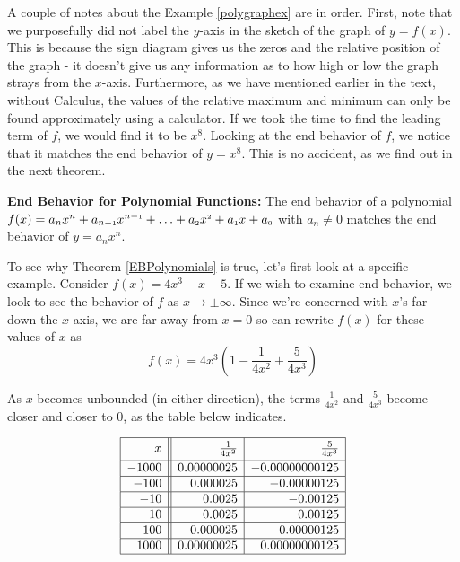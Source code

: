 A couple of notes about the Example \ref{polygraphex} are in order.  First, note that we purposefully did not label the $y$-axis in the sketch of the graph of $y=f(x)$.  This is because the sign diagram gives us the zeros and the relative position of the graph - it doesn't give us any information as to how high or low the graph strays from the $x$-axis.  Furthermore, as we have mentioned earlier in the text, without Calculus, the values of the relative maximum and minimum can only be found approximately using a calculator.  If we took the time to find the leading term of $f$, we would find it to be $x^8$.  Looking at the end behavior of $f$, we notice that it matches the end behavior of $y=x^8$.  This is no accident, as we find out in the next theorem.

\medskip

\colorbox{ResultColor}{\bbm

\begin{thm} \label{EBPolynomials}\textbf{End Behavior for Polynomial Functions:} The end behavior of a polynomial $f(x) = a_{n} x^{n} + a_{n-\mbox{\tiny$1$}} x^{n-\mbox{\tiny$1$}} + \ldots + a_{\mbox{\tiny $2$}} x^{\mbox{\tiny $2$}} + a_{\mbox{\tiny $1$}} x + a_{\mbox{\tiny $0$}}$ with $a_{n} \neq 0$ matches the end behavior of $y = a_{n} x^{n}$.  
\end{thm}

\ebm}

\medskip

To see why Theorem \ref{EBPolynomials} is true, let's first look at a specific example.  Consider $f(x) = 4x^3 - x + 5$.  If we wish to examine end behavior, we look to see the behavior of $f$ as $x \rightarrow \pm \infty$.  Since we're concerned with $x$'s far down the $x$-axis, we are far away from $x=0$ so can rewrite $f(x)$ for these values of $x$ as \[ f(x) = 4x^3 \left( 1 - \dfrac{1}{4x^2} + \dfrac{5}{4x^3}\right)\]

As $x$ becomes unbounded (in either direction), the terms $\frac{1}{4x^2}$ and $\frac{5}{4x^3}$ become closer and closer to $0$, as the table below indicates.


\[ \begin{array}{|r||r|r|}  

\hline 

 x & \frac{1}{4x^2} & \frac{5}{4x^3} \vphantom{\dfrac{a}{a}} \\ [2pt] \hline
-1000  & 0.00000025 & -0.00000000125 \\  \hline
-100  & 0.000025 & -0.00000125 \\  \hline
-10 & 0.0025 & -0.00125 \\  \hline
10  & 0.0025 & 0.00125 \\  \hline
100 & 0.000025 & 0.00000125 \\  \hline
1000 & 0.00000025 & 0.00000000125 \\  \hline
\end{array} \]

